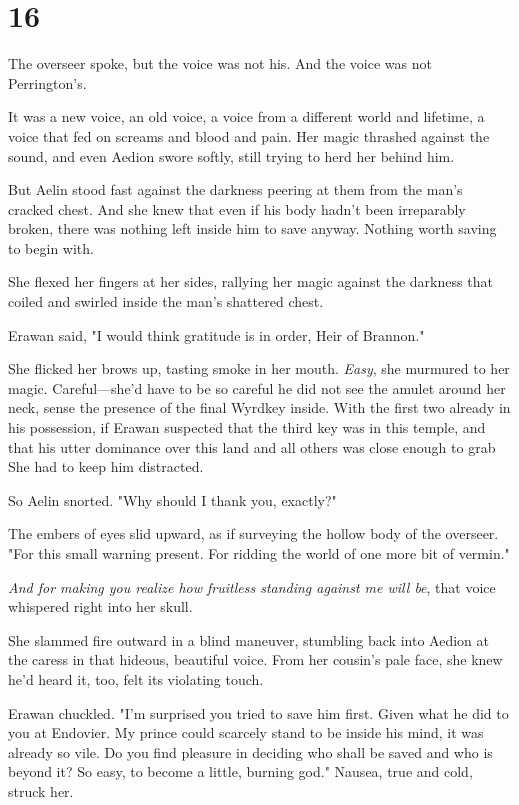 
\chapter{16}

The overseer spoke, but the voice was not his. And the voice was not Perrington's.

It was a new voice, an old voice, a voice from a different world and lifetime, a voice that fed on screams and blood and pain. Her magic thrashed against the sound, and even Aedion swore softly, still trying to herd her behind him.

But Aelin stood fast against the darkness peering at them from the man's cracked chest. And she knew that even if his body hadn't been irreparably broken, there was nothing left inside him to save anyway. Nothing worth saving to begin with.

She flexed her fingers at her sides, rallying her magic against the darkness that coiled and swirled inside the man's shattered chest.

Erawan said, "I would think gratitude is in order, Heir of Brannon."

She flicked her brows up, tasting smoke in her mouth. \emph{Easy}, she murmured to her magic. Careful---she'd have to be so careful he did not see the amulet around her neck, sense the presence of the final Wyrdkey inside. With the first two already in his possession, if Erawan suspected that the third key was in this temple, and that his utter dominance over this land and all others was close enough to grab
 She had to keep him distracted.

So Aelin snorted. "Why should I thank you, exactly?"

The embers of eyes slid upward, as if surveying the hollow body of the overseer. "For this small warning present. For ridding the world of one more bit of vermin."

\emph{And for making you realize how fruitless standing against me will be}, that voice whispered right into her skull.

She slammed fire outward in a blind maneuver, stumbling back into Aedion at the caress in that hideous, beautiful voice. From her cousin's pale face, she knew he'd heard it, too, felt its violating touch.

Erawan chuckled. "I'm surprised you tried to save him first. Given what he did to you at Endovier. My prince could scarcely stand to be inside his mind, it was already so vile. Do you find pleasure in deciding who shall be saved and who is beyond it? So easy, to become a little, burning god." Nausea, true and cold, struck her.

